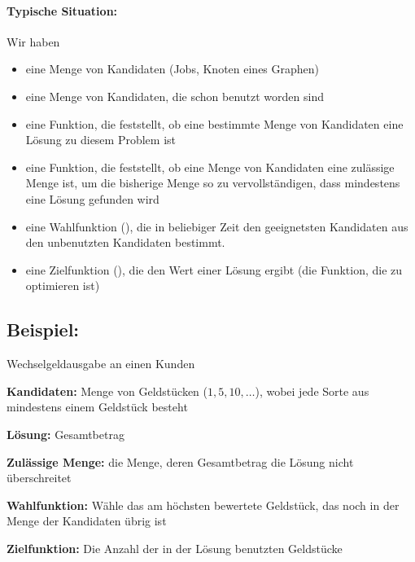\documentclass[a4paper]{scrartcl}
\begin{document}
\paragraph{Typische Situation:} Wir haben
\begin{itemize}
	\item eine Menge von Kandidaten (Jobs, Knoten eines Graphen)
	\item eine Menge von Kandidaten, die schon benutzt worden sind
	\item eine Funktion, die feststellt, ob eine bestimmte Menge von Kandidaten eine Lösung zu diesem Problem ist
	\item eine Funktion, die feststellt, ob eine Menge von Kandidaten eine zulässige Menge ist, um die bisherige Menge so zu vervollständigen,
	      dass mindestens eine Lösung gefunden wird
	\item eine Wahlfunktion (), die in beliebiger Zeit den geeignetsten Kandidaten aus den unbenutzten Kandidaten bestimmt.
	\item eine Zielfunktion (), die den Wert einer Lösung ergibt (die Funktion, die zu optimieren ist)
\end{itemize}

\subsection{Beispiel:} Wechselgeldausgabe an einen Kunden
\begin{description}
	\item{\textbf{Kandidaten:}} Menge von Geldstücken ($1, 5, 10, \dots$), wobei jede Sorte aus mindestens einem Geldstück besteht
	\item{\textbf{Lösung:}} Gesamtbetrag
	\item{\textbf{Zulässige Menge:}} die Menge, deren Gesamtbetrag die Lösung nicht überschreitet
	\item{\textbf{Wahlfunktion:}} Wähle das am höchsten bewertete Geldstück, das noch in der Menge der Kandidaten übrig ist
	\item{\textbf{Zielfunktion:}} Die Anzahl der in der Lösung benutzten Geldstücke
\end{description}
\end{document}
